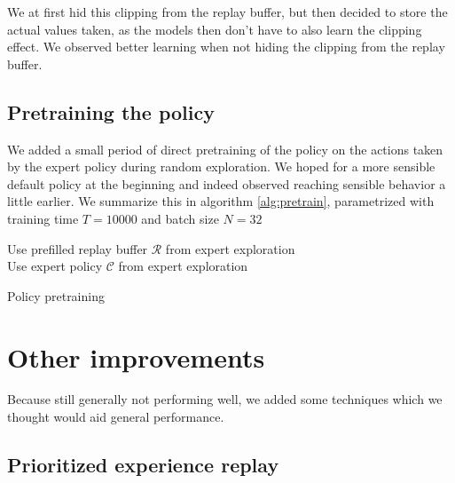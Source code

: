 \documentclass[hyperref,german,beleg]{cgvpub}
\begin{document}
We at first hid this clipping from the replay buffer, but then decided to store the actual values taken, as the models then don't have to also learn the clipping effect. We observed better learning when not hiding the clipping from the replay buffer.

\subsection{Pretraining the policy}

We added a small period of direct pretraining of the policy on the actions taken by the expert policy during random exploration. We hoped for a more sensible default policy at the beginning and indeed observed reaching sensible behavior a little earlier. We summarize this in algorithm \ref{alg:pretrain}, parametrized with training time $T=10000$ and batch size $N=32$

\begin{algorithm}
\SetAlgoLined
Use prefilled replay buffer $\mathcal{R}$ from expert exploration\\
Use expert policy $\mathcal{C}$ from expert exploration\\
\caption{Policy pretraining}
\label{alg:pretrain}
\end{algorithm}

\section{Other improvements}

Because still generally not performing well, we added some techniques which we thought would aid general performance.

\subsection{Prioritized experience replay}
\end{document}
